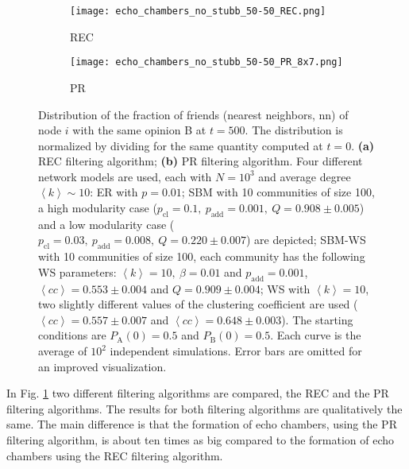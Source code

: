 \documentclass[11 pt , letterpaper , twoside , openright]{book}
\begin{document}
\begin{figure}[H]
  \begin{subfigure}[b]{0.49\textwidth}
    \caption{REC}
  	\texttt{[image: echo\_chambers\_no\_stubb\_50-50\_REC.png]}
      \end{subfigure}
  \begin{subfigure}[b]{0.49\textwidth}
    \caption{PR}
  	\texttt{[image: echo\_chambers\_no\_stubb\_50-50\_PR\_8x7.png]}
  \end{subfigure}
  \captionsetup{format=plain}
  \caption[Distribution of the fraction of friends (nearest neighbors, nn) of node $i$ with the same opinion B at $t=500$, $\left<P_{\text{B}}^{\text{nn}}\right>$, for an initial $50/50$ opinion distribution.]{Distribution of the fraction of friends (nearest neighbors, nn) of node $i$ with the same opinion B at $t = 500$. The distribution is normalized by dividing for the same quantity computed at $t=0$. \textbf{(a)} REC filtering algorithm; \textbf{(b)} PR filtering algorithm. Four different network models are used, each with $N = 10^3$ and average degree $\left<k\right> \sim 10$: ER with $p = 0.01$; SBM with 10 communities of size 100, a high modularity case ($p_{\text{cl}} = 0.1,\ p_{\text{add}} = 0.001,\ Q = 0.908 \pm 0.005$) and a low modularity case ($p_{\text{cl}} = 0.03,\ p_{\text{add}} = 0.008,\ Q = 0.220 \pm 0.007$) are depicted; SBM-WS with 10 communities of size 100, each community has the following WS parameters: $\left<k\right> = 10,\ \beta = 0.01$ and $p_{\text{add}} = 0.001$, $\left<cc\right> = 0.553 \pm 0.004$ and $Q = 0.909 \pm 0.004$; WS with $\left<k\right> = 10$, two slightly different values of the clustering coefficient are used ($\left<cc\right> = 0.557 \pm 0.007$ and $\left<cc\right> = 0.648 \pm 0.003$). The starting conditions are $P_{\text{A}}(0) = 0.5$ and $P_{\text{B}}(0) = 0.5$. Each curve is the average of $10^2$ independent simulations. Error bars are omitted for an improved visualization.}
\label{echo_50_50}
\end{figure}
\noindent
In Fig. \ref{echo_50_50} two different filtering algorithms are compared, the REC and the PR filtering algorithms. The results for both filtering algorithms are qualitatively the same. The main difference is that the formation of echo chambers, using the PR filtering algorithm, is about ten times as big compared to the formation of echo chambers using the REC filtering algorithm. \\
\newline
\end{document}
